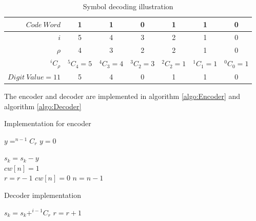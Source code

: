 \begin{table}[!htbp]
\caption{Symbol decoding illustration}
\begin{tabular}{|r||c|c|c|c|c|c|} 
\hline

$Code~Word$ & 1 & 1 & 0 & 1 & 1 & 0 \\  \hline
$i$ & 5 & 4 & 3 & 2 & 1 & 0 \\  \hline
$\rho$ & 4 & 3 & 2 & 2 & 1 & 0 \\  \hline
$^iC_\rho$ & $^5C_4=5$ & $^4C_3=4$ & $^3C_2=3$ & $^2C_2=1$ & $^1C_1=1$ & $^0C_0=1$ \\  \hline
$Digit~Value=11$ & 5 & 4 & 0 & 1 & 1 & 0 \\  \hline
\end{tabular}
\label{tab:decodeExample}
\end{table}




%


The encoder and decoder are implemented in algorithm \ref{algo:Encoder} and algorithm \ref{algo:Decoder}

\begin{algorithm}[ht] 
\caption{Implementation for encoder} 
\label{algo:Encoder}

{
{
$y = ^{n-1}C_r$
}{
$y=0$
}

{
$s_k = s_k - y$ \\
$cw[n] = 1$ \\
$r = r -1$
}{
$cw[n] = 0$
}
$n = n - 1$
}
\end{algorithm}


\begin{algorithm}[ht] 
\caption{Decoder implementation} 
\label{algo:Decoder}
 
{
{
{
$s_k = s_k + ^{i-1}C_r$ 
}
$r = r + 1$
}
}
\end{algorithm}


